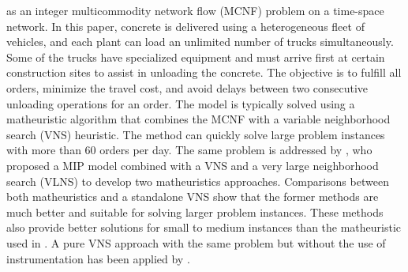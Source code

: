 \documentclass[]{article}
\begin{document}
\cite{schmid2009hybrid} as an integer multicommodity network flow (MCNF) problem on a time-space network. In this paper, concrete is delivered using a heterogeneous fleet of vehicles, and each plant can load an unlimited number of trucks simultaneously. Some of the trucks have specialized equipment and must arrive first at certain construction sites to assist in unloading the concrete. The objective is to fulfill all orders, minimize the travel cost, and avoid delays between two consecutive unloading operations for an order. The model is typically solved using a matheuristic algorithm that combines the MCNF with a variable neighborhood search (VNS) heuristic. The method can quickly solve large problem instances with more than 60 orders per day. The same problem is addressed by \cite{schmid2010hybridization}, who proposed a MIP model combined with a VNS and a very large neighborhood search (VLNS) to develop two matheuristics approaches. Comparisons between both matheuristics and a standalone VNS show that the former methods are much better and suitable for solving larger problem instances. These methods also provide better solutions for small to medium instances than the matheuristic used in \cite{schmid2009hybrid}. A pure VNS approach with the same problem but without the use of instrumentation has been applied by \cite{payr2009optimizing}.
\end{document}
